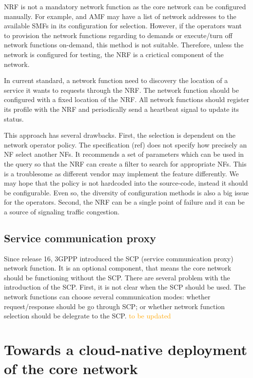 \documentclass[a4paper]{article}
\begin{document}
NRF is not a mandatory network function as the core network can be configured manually. For example, and AMF may have a list of network addresses to the available SMFs in its configuration for selection. However, if the operators want to provision the network functions regarding to demands or execute/turn off network functions on-demand, this method is not suitable. Therefore, unless the network is configured for testing, the NRF is a crictical component of the network.

In current standard, a network function need to discovery the location of a service it wants to requests through the NRF. The network function should be configured with a fixed location of the NRF. All network functions should register its profile with the NRF and periodically send a heartbeat signal to update its status. 



This approach has several drawbacks. First, the selection is dependent on the network operator policy. The specification (ref) does not specify how precisely an NF select another NFs. It recommends a set of parameters which can be used in the query so that the NRF can create a filter to search for appropriate NFs. This is a troublesome as different vendor may implement the feature differently. We may hope that the policy is not hardcoded into the source-code, instead it should be configurable. Even so, the diversity of configuration methods is also a big issue for the operators.
Second, the NRF can be a single point of failure and it can be a source of signaling traffic congestion.



\subsection{Service communication proxy}

Since release 16, 3GPPP introduced the SCP (service communication proxy) network function. It is an optional component, that means the core network should be functioning without the SCP. 
There are several problem with the introduction of the SCP. First, it is not clear when the SCP should be used. The network functions can choose several communication modes: whether request/response should be go through SCP; or whether network function selection should be delegrate to the SCP. 
\textcolor{orange}{to be updated}

\section{Towards a cloud-native deployment of the core network}
\end{document}
